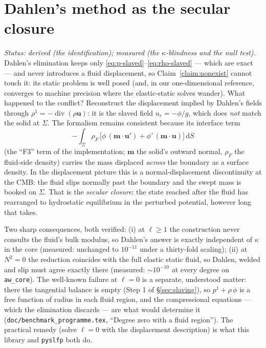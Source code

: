 \documentclass[11pt]{article}
\newcommand{\bu}{\mathbf{u}}
\newcommand{\dS}{\,\mathrm{d}S}
\newcommand{\Div}{\operatorname{div}}
\newcommand{\code}[1]{\texttt{#1}}
\begin{document}
\section{Dahlen's method as the secular closure}
\label{sec:dahlen}

\emph{Status: derived (the identification); measured (the
$\kappa$-blindness and the null test).} Dahlen's elimination keeps
only \eqref{eq:p-slaved}--\eqref{eq:rho-slaved} --- which are exact
--- and never introduces a fluid displacement, so
Claim~\ref{claim:nonexist} cannot touch it: its static problem is
well posed (and, in our one-dimensional reference, converges to
machine precision where the elastic-static solves wander). What
happened to the conflict? Reconstruct the displacement implied by
Dahlen's fields through $\rho^1 = -\Div(\rho\bu)$: it is the slaved
field $u_r = -\phi/g$, which does \emph{not} match the solid at
$\Sigma$. The formalism remains consistent because its interface
term
\[
  -\int_{\Sigma} \rho_F\,
     \bigl[\phi\,(\mathbf{m}\cdot\bu') + \phi'\,(\mathbf{m}\cdot\bu)\bigr]\dS
\]
(the ``F3'' term of the implementation; $\mathbf{m}$ the solid's
outward normal, $\rho_F$ the fluid-side density) carries the mass
displaced \emph{across} the boundary as a surface density. In the
displacement picture this is a normal-displacement discontinuity at
the CMB: the fluid slips normally past the boundary and the swept
mass is booked on $\Sigma$. That is the \emph{secular closure}: the
state reached after the fluid has rearranged to hydrostatic
equilibrium in the perturbed potential, however long that takes.

Two sharp consequences, both verified:
(i) at $\ell \ge 1$ the construction never consults the fluid's bulk
modulus, so Dahlen's answer is exactly independent of $\kappa$ in the
core (measured: unchanged to $10^{-11}$ under a thirty-fold scaling);
(ii) at $N^2 = 0$ the reduction coincides with the full elastic
static fluid, so Dahlen, welded and slip must agree exactly there
(measured: $\sim 10^{-10}$ at every degree on \code{aw\_core}). The
well-known failure at $\ell = 0$ is a separate, understood matter:
there the tangential balance is empty (Step 1 of
\S\ref{sec:slaving}), so $p^1 + \rho\,\phi$ is a free function of
radius in each fluid region, and the compressional equations --- which
the elimination discards --- are what would determine it
(\code{doc/benchmark\_programme.tex}, ``Degree zero with a fluid
region''). The practical remedy (solve $\ell = 0$ with the displacement description) is what
this library and \code{pyslfp} both do.
\end{document}
